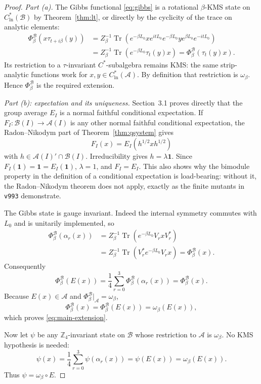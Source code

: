\documentclass[11pt]{article}
\theoremstyle{remark}
\newcommand{\A}{\mathcal A}
\newcommand{\B}{\mathcal B}
\newcommand{\Z}{\mathbb Z}
\newcommand{\id}{\mathbf 1}
\newcommand{\Tr}{\operatorname{Tr}}
\begin{document}
\begin{proof}
\emph{Part (a).}
The Gibbs functional \eqref{eq:gibbs} is a rotational
$\beta$-KMS state on $C^*_{\mathrm{ln}}(\B)$ by
Theorem~\ref{thm:lt}, or directly by the cyclicity of the trace on
analytic elements:
\[
\begin{aligned}
 \Phi_\beta^{\B}(x\tau_{t+i\beta}(y))
 &=Z_\beta^{-1}
   \Tr(e^{-\beta L_0}x e^{itL_0}e^{-\beta L_0}
        y e^{\beta L_0}e^{-itL_0})\\
 &=Z_\beta^{-1}
   \Tr(e^{-\beta L_0}\tau_t(y)x)
 =\Phi_\beta^{\B}(\tau_t(y)x).
\end{aligned}
\tag{4.2}\label{eq:gibbs-kms}
\]
Its restriction to a $\tau$-invariant $C^*$-subalgebra remains KMS:
the same strip-analytic functions work for $x,y\in
C^*_{\mathrm{ln}}(\A)$.  By definition that restriction is
$\omega_\beta$.  Hence $\Phi_\beta^{\B}$ is the required extension.

\emph{Part (b): expectation and its uniqueness.}
Section~3.1 proves directly that the group average $E_I$ is a normal
faithful conditional expectation.  If $F_I:\B(I)\to\A(I)$ is any
other normal faithful conditional expectation, the
Radon--Nikodym part of Theorem~\ref{thm:qsystem} gives
\[
 F_I(x)=E_I(h^{1/2}xh^{1/2})
\]
with $h\in\A(I)'\cap\B(I)$.  Irreducibility gives
$h=\lambda\id$.  Since $F_I(\id)=\id=E_I(\id)$, $\lambda=1$, and
$F_I=E_I$.  This also shows why the bimodule property in the
definition of a conditional expectation is load-bearing: without
it, the Radon--Nikodym theorem does not apply, exactly as the
finite mutants in \texttt{v993} demonstrate.

The Gibbs state is gauge invariant.  Indeed the internal symmetry
commutes with $L_0$ and is unitarily implemented, so
\[
\begin{aligned}
 \Phi_\beta^{\B}(\alpha_r(x))
 &=Z_\beta^{-1}\Tr(e^{-\beta L_0}V_rxV_r^*)\\
 &=Z_\beta^{-1}\Tr(V_r^*e^{-\beta L_0}V_rx)
 =\Phi_\beta^{\B}(x).
\end{aligned}
\tag{4.3}\label{eq:gauge-invariance}
\]
Consequently
\[
 \Phi_\beta^{\B}(E(x))
 =\frac14\sum_{r=0}^{3}\Phi_\beta^{\B}(\alpha_r(x))
 =\Phi_\beta^{\B}(x).
\tag{4.4}\label{eq:E-preserves}
\]
Because $E(x)\in\A$ and
$\Phi_\beta^{\B}|_{\A}=\omega_\beta$,
\[
 \Phi_\beta^{\B}(x)
 =\Phi_\beta^{\B}(E(x))
 =\omega_\beta(E(x)),
\]
which proves \eqref{eq:main-extension}.

Now let $\psi$ be any $\Z_4$-invariant state on $\B$ whose restriction
to $\A$ is $\omega_\beta$.  No KMS hypothesis is needed:
\[
 \psi(x)
 =\frac14\sum_{r=0}^{3}\psi(\alpha_r(x))
 =\psi(E(x))
 =\omega_\beta(E(x)).
\tag{4.5}\label{eq:inv-unique}
\]
Thus $\psi=\omega_\beta\circ E$.


\end{proof}
\end{document}
